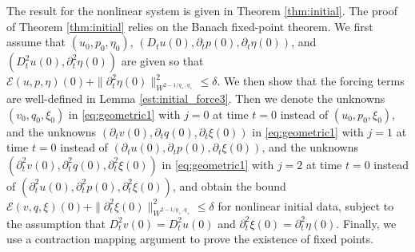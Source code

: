 \documentclass[letterpaper,reqno,10pt,twoside]{amsart}
\theoremstyle{definition}
\theoremstyle{remark}
\def\p{\partial}
\begin{document}
\begin{appendix}
			
			The result for the nonlinear system is given in Theorem \ref{thm:initial}.
			The proof of Theorem \ref{thm:initial} relies on the Banach fixed-point theorem. We first assume that $(u_0, p_0, \eta_0)$, $(D_tu(0), \p_{t}p(0), \p_{t}\eta(0))$, and $(D_t^2u(0), \p_t^2\eta(0))$ are given so that
			$\mathcal{E} (u,p,\eta)(0) + \|\p_t^{2}\eta(0)\|_{W^{2-1/q_+, q_+}}^2\le \delta$. We then show that the forcing terms are well-defined in Lemma \ref{est:initial_force3}. Then we denote the unknowns $(v_0, q_0, \xi_0)$ in \eqref{eq:geometric1} with $j=0$ at time $t=0$ instead of $(u_0, p_0, \xi_0)$, and the unknowns $(\p_tv(0), \p_tq(0), \p_t\xi(0))$ in \eqref{eq:geometric1} with $j=1$ at time $t=0$ instead of $(\p_tu(0), \p_tp(0), \p_t\xi(0))$, and the unknowns $(\p_t^{2}v(0), \p_t^{2}q(0), \p_t^{2}\xi(0))$ in \eqref{eq:geometric1} with $j=2$ at time $t=0$ instead of $(\p_t^{2}u(0), \p_t^{2}p(0), \p_t^{2}\xi(0))$, and obtain the bound $\mathcal{E}(v,q,\xi)(0) + \|\p_t^2\xi(0)\|_{W^{2-1/q_+, q_+}}^2\le \delta$ for nonlinear initial data, subject to the assumption that $D_t^2v(0) = D_t^2u(0)$ and $\p_t^2\xi(0) = \p_t^2 \eta(0)$. Finally, we use a contraction mapping argument to prove the existence of fixed points.
			

\end{appendix}
\end{document}
